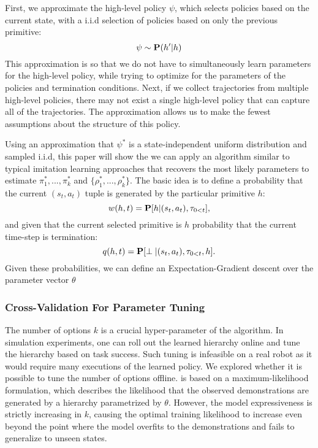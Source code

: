 
First, we approximate the high-level policy $\psi$, which selects policies based on the current state, with a i.i.d selection of policies based on only the previous primitive:
\[
\psi \sim \mathbf{P}(h' \vert h)
\]
This approximation is so that we do not have to simultaneously learn parameters for the high-level policy, while trying to optimize for the parameters of the policies and termination conditions.
Next, if we collect trajectories from multiple high-level policies, there may not exist a single high-level policy that can capture all of the trajectories.
The approximation allows us to make the fewest assumptions about the structure of this policy.

Using an approximation that $\psi^*$ is a state-independent uniform distribution and sampled i.i.d, this paper will show the we can apply an algorithm similar to typical imitation learning approaches that recovers the most likely parameters to estimate $\pi^*_{1},...,\pi^*_{k}$ and $\{\rho^*_{1},...,\rho^*_{k}\}$. The basic idea is to define a probability that the current $(s_t,a_t)$ tuple is generated by the particular primitive $h$:
\[
w(h,t) = \mathbf{P}[h \vert (s_t, a_t), \tau_{0<t}],
\]
and given that the current selected primitive is $h$ probability that the current time-step is termination:
\[
q(h,t) = \mathbf{P}[\perp \vert (s_t, a_t), \tau_{0<t}, h].
\]
Given these probabilities, we can define an Expectation-Gradient descent over the parameter vector $\theta$


\subsubsection{Cross-Validation For Parameter Tuning}
The number of options $k$ is a crucial hyper-parameter of the algorithm.
In simulation experiments, one can roll out the learned hierarchy online and tune the hierarchy based on task success.
Such tuning is infeasible on a real robot as it would require many executions of the learned policy.
We explored whether it is possible to tune the number of options offline.
\alg is based on a maximum-likelihood formulation, which describes the likelihood that the observed demonstrations are generated by a hierarchy parametrized by $\theta$.
However, the model expressiveness is strictly increasing in $k$, causing the optimal training likelihood to increase even beyond the point where the model overfits to the demonstrations and fails to generalize to unseen states.

